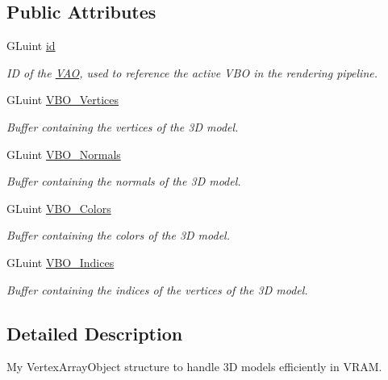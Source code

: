 \subsection*{Public Attributes}
\begin{DoxyCompactItemize}
\item 
G\+Luint \hyperlink{struct_render_1_1_low_level_wrapper_1_1_v_a_o_a74e69d0a6b9572bcd41e1d9119c97c3a}{id}
\begin{DoxyCompactList}\small\item\em ID of the \hyperlink{struct_render_1_1_low_level_wrapper_1_1_v_a_o}{V\+AO}, used to reference the active V\+BO in the rendering pipeline. \end{DoxyCompactList}\item 
G\+Luint \hyperlink{struct_render_1_1_low_level_wrapper_1_1_v_a_o_a20979b47abd8e87579c9c96cf7222b38}{V\+B\+O\+\_\+\+Vertices}
\begin{DoxyCompactList}\small\item\em Buffer containing the vertices of the 3D model. \end{DoxyCompactList}\item 
G\+Luint \hyperlink{struct_render_1_1_low_level_wrapper_1_1_v_a_o_a1fd9840e64e000d2cc5634bd15fbe76d}{V\+B\+O\+\_\+\+Normals}
\begin{DoxyCompactList}\small\item\em Buffer containing the normals of the 3D model. \end{DoxyCompactList}\item 
G\+Luint \hyperlink{struct_render_1_1_low_level_wrapper_1_1_v_a_o_a207a0039f53847d17f612ea758ab94f8}{V\+B\+O\+\_\+\+Colors}
\begin{DoxyCompactList}\small\item\em Buffer containing the colors of the 3D model. \end{DoxyCompactList}\item 
G\+Luint \hyperlink{struct_render_1_1_low_level_wrapper_1_1_v_a_o_a2749bf2659a5d8ddd844e75d63c54998}{V\+B\+O\+\_\+\+Indices}
\begin{DoxyCompactList}\small\item\em Buffer containing the indices of the vertices of the 3D model. \end{DoxyCompactList}\end{DoxyCompactItemize}


\subsection{Detailed Description}
My Vertex\+Array\+Object structure to handle 3D models efficiently in V\+R\+AM. 

